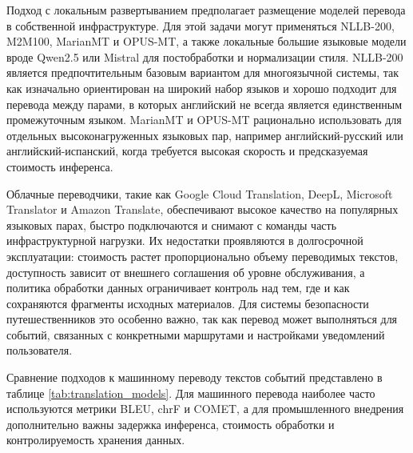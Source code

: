 Подход с локальным развертыванием предполагает размещение моделей перевода в собственной инфраструктуре. Для этой задачи могут применяться NLLB-200, M2M100, MarianMT и OPUS-MT, а также локальные большие языковые модели вроде Qwen2.5 или Mistral для постобработки и нормализации стиля\cite{nllb_bib,m2m100_bib,marian_nmt_bib,opus_mt_bib,qwen25_bib,mistral7b_bib}. NLLB-200 является предпочтительным базовым вариантом для многоязычной системы, так как изначально ориентирован на широкий набор языков и хорошо подходит для перевода между парами, в которых английский не всегда является единственным промежуточным языком. MarianMT и OPUS-MT рационально использовать для отдельных высоконагруженных языковых пар, например английский-русский или английский-испанский, когда требуется высокая скорость и предсказуемая стоимость инференса.

Облачные переводчики, такие как Google Cloud Translation, DeepL, Microsoft Translator и Amazon Translate, обеспечивают высокое качество на популярных языковых парах, быстро подключаются и снимают с команды часть инфраструктурной нагрузки. Их недостатки проявляются в долгосрочной эксплуатации: стоимость растет пропорционально объему переводимых текстов, доступность зависит от внешнего соглашения об уровне обслуживания, а политика обработки данных ограничивает контроль над тем, где и как сохраняются фрагменты исходных материалов. Для системы безопасности путешественников это особенно важно, так как перевод может выполняться для событий, связанных с конкретными маршрутами и настройками уведомлений пользователя.

Сравнение подходов к машинному переводу текстов событий представлено в таблице \ref{tab:translation_models}. Для машинного перевода наиболее часто используются метрики BLEU, chrF и COMET, а для промышленного внедрения дополнительно важны задержка инференса, стоимость обработки и контролируемость хранения данных.

